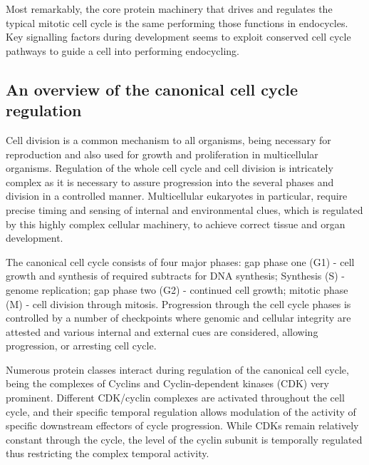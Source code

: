 \documentclass[11pt,twoside,a4paper]{report}
\begin{document}
		Most remarkably, the core protein machinery that drives and regulates the typical mitotic cell cycle is the same performing those functions in endocycles. Key signalling factors during development seems to exploit conserved cell cycle pathways to guide a cell into performing endocycling. 
		
			\subsection{An overview of the canonical cell cycle regulation}
			Cell division is a common mechanism to all organisms, being necessary for reproduction and also used for growth and proliferation in multicellular organisms. Regulation of the whole cell cycle and cell division is intricately complex as it is necessary to assure progression into the several phases and division in a controlled manner. Multicellular eukaryotes in particular, require precise timing and sensing of internal and environmental clues, which is regulated by this highly complex cellular machinery, to achieve correct tissue and organ development.
			
			The canonical cell cycle consists of four major phases: gap phase one (G1) - cell growth and synthesis of required subtracts for DNA synthesis; Synthesis (S) - genome replication; gap phase two (G2) - continued cell growth; mitotic phase (M) - cell division through mitosis. Progression through the cell cycle phases is controlled by a number of checkpoints where genomic and cellular integrity are attested and various internal and external cues are considered, allowing progression, or arresting cell cycle.
			
			Numerous protein classes interact during regulation of the canonical cell cycle, being the complexes of Cyclins and Cyclin-dependent kinases (CDK) very prominent. Different CDK/cyclin complexes are activated throughout the cell cycle, and their specific temporal regulation allows modulation of the activity of specific downstream effectors of cycle progression. While CDKs remain relatively constant through the cycle, the level of the cyclin subunit is temporally regulated thus restricting the complex temporal activity. 
			
\end{document}
